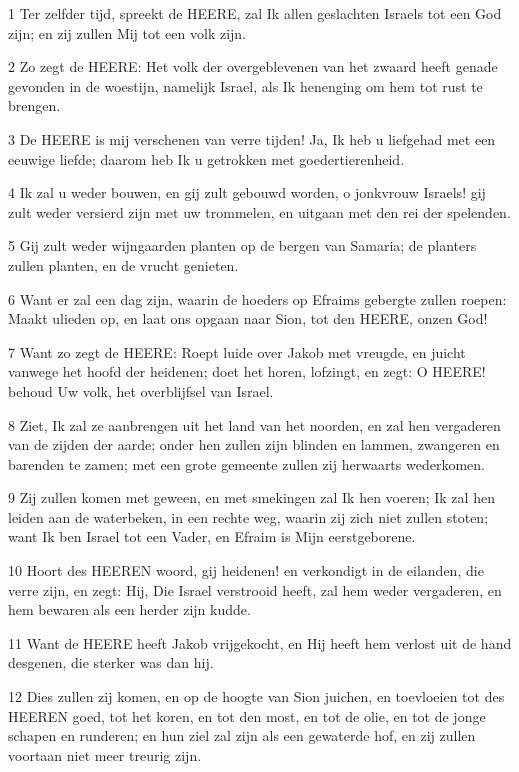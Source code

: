 \par 1 Ter zelfder tijd, spreekt de HEERE, zal Ik allen geslachten Israels tot een God zijn; en zij zullen Mij tot een volk zijn.
\par 2 Zo zegt de HEERE: Het volk der overgeblevenen van het zwaard heeft genade gevonden in de woestijn, namelijk Israel, als Ik henenging om hem tot rust te brengen.
\par 3 De HEERE is mij verschenen van verre tijden! Ja, Ik heb u liefgehad met een eeuwige liefde; daarom heb Ik u getrokken met goedertierenheid.
\par 4 Ik zal u weder bouwen, en gij zult gebouwd worden, o jonkvrouw Israels! gij zult weder versierd zijn met uw trommelen, en uitgaan met den rei der spelenden.
\par 5 Gij zult weder wijngaarden planten op de bergen van Samaria; de planters zullen planten, en de vrucht genieten.
\par 6 Want er zal een dag zijn, waarin de hoeders op Efraims gebergte zullen roepen: Maakt ulieden op, en laat ons opgaan naar Sion, tot den HEERE, onzen God!
\par 7 Want zo zegt de HEERE: Roept luide over Jakob met vreugde, en juicht vanwege het hoofd der heidenen; doet het horen, lofzingt, en zegt: O HEERE! behoud Uw volk, het overblijfsel van Israel.
\par 8 Ziet, Ik zal ze aanbrengen uit het land van het noorden, en zal hen vergaderen van de zijden der aarde; onder hen zullen zijn blinden en lammen, zwangeren en barenden te zamen; met een grote gemeente zullen zij herwaarts wederkomen.
\par 9 Zij zullen komen met geween, en met smekingen zal Ik hen voeren; Ik zal hen leiden aan de waterbeken, in een rechte weg, waarin zij zich niet zullen stoten; want Ik ben Israel tot een Vader, en Efraim is Mijn eerstgeborene.
\par 10 Hoort des HEEREN woord, gij heidenen! en verkondigt in de eilanden, die verre zijn, en zegt: Hij, Die Israel verstrooid heeft, zal hem weder vergaderen, en hem bewaren als een herder zijn kudde.
\par 11 Want de HEERE heeft Jakob vrijgekocht, en Hij heeft hem verlost uit de hand desgenen, die sterker was dan hij.
\par 12 Dies zullen zij komen, en op de hoogte van Sion juichen, en toevloeien tot des HEEREN goed, tot het koren, en tot den most, en tot de olie, en tot de jonge schapen en runderen; en hun ziel zal zijn als een gewaterde hof, en zij zullen voortaan niet meer treurig zijn.
